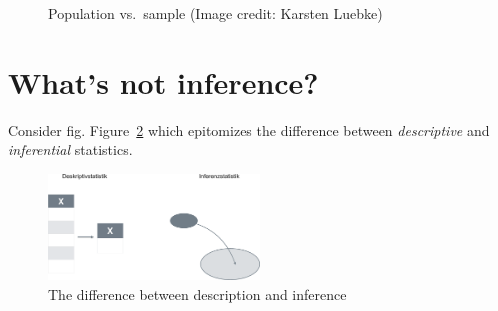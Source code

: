 \documentclass[
  letterpaper,
  DIV=11,
  numbers=noendperiod]{scrreprt}
\theoremstyle{definition}
\theoremstyle{definition}
\theoremstyle{remark}
\begin{document}
\begin{figure}
\begin{minipage}[t]{0.50\linewidth}
{\centering 


}

\end{minipage}%

\caption{\label{fig-pop-sample}Population vs.~sample (Image credit:
Karsten Luebke)}

\end{figure}

\hypertarget{whats-not-inference}{%
\section{What's not inference?}\label{whats-not-inference}}

Consider fig. Figure~\ref{fig-desk-inf} which epitomizes the difference
between \emph{descriptive} and \emph{inferential} statistics.

\begin{figure}

{\centering \includegraphics[width=0.5\textwidth,height=\textheight]{./img/desk_vs_inf-crop.png}

}

\caption{\label{fig-desk-inf}The difference between description and
inference}

\end{figure}
\end{document}
